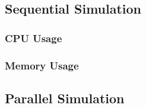\subsection{Sequential Simulation}
\subsubsection{CPU Usage}
\subsubsection{Memory Usage}
\subsection{Parallel Simulation}
